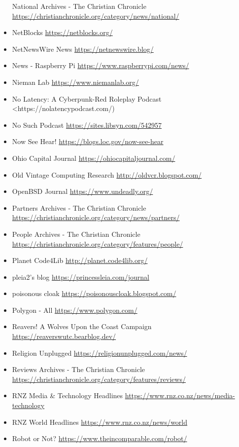 \begin{itemize}
  National Archives - The Christian Chronicle
  \url{https://christianchronicle.org/category/news/national/}
\item
  NetBlocks \url{https://netblocks.org/}
\item
  NetNewsWire News \url{https://netnewswire.blog/}
\item
  News - Raspberry Pi \url{https://www.raspberrypi.com/news/}
\item
  Nieman Lab \url{https://www.niemanlab.org/}
\item
  No Latency: A Cyberpunk-Red Roleplay Podcast
  \textless https://nolatencypodcast.com/)\\
\item
  No Such Podcast \url{https://sites.libsyn.com/542957}
\item
  Now See Hear! \url{https://blogs.loc.gov/now-see-hear}
\item
  Ohio Capital Journal \url{https://ohiocapitaljournal.com/}
\item
  Old Vintage Computing Research \url{http://oldvcr.blogspot.com/}
\item
  OpenBSD Journal \url{https://www.undeadly.org/}
\item
  Partners Archives - The Christian Chronicle
  \url{https://christianchronicle.org/category/news/partners/}
\item
  People Archives - The Christian Chronicle
  \url{https://christianchronicle.org/category/features/people/}
\item
  Planet Code4Lib \url{http://planet.code4lib.org/}
\item
  pleia2's blog \url{https://princessleia.com/journal}
\item
  poisonous cloak \url{https://poisonouscloak.blogspot.com/}
\item
  Polygon - All \url{https://www.polygon.com/}
\item
  Reavers! A Wolves Upon the Coast Campaign
  \url{https://reaverswutc.bearblog.dev/}
\item
  Religion Unplugged \url{https://religionunplugged.com/news/}
\item
  Reviews Archives - The Christian Chronicle
  \url{https://christianchronicle.org/category/features/reviews/}
\item
  RNZ Media \& Technology Headlines
  \url{https://www.rnz.co.nz/news/media-technology}
\item
  RNZ World Headlines \url{https://www.rnz.co.nz/news/world}
\item
  Robot or Not? \url{https://www.theincomparable.com/robot/}

\end{itemize}
